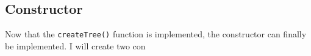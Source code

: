 \documentclass[../../../../main.tex]{subfiles}
\begin{document}
\subsection{Constructor}
Now that the \texttt{createTree()} function is implemented, the constructor can finally be implemented.  I will create two con
\newpage
\end{document}
